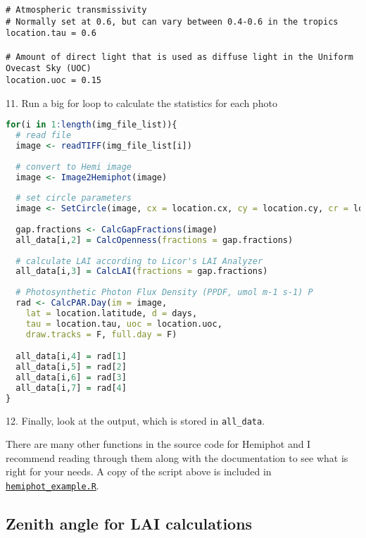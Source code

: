 \documentclass{article}
\newcommand\file[1]{\texttt{\underline{#1}}}
\begin{document}
\begin{minipage}{\linewidth}
\begin{lstlisting}
# Atmospheric transmissivity
# Normally set at 0.6, but can vary between 0.4-0.6 in the tropics
location.tau = 0.6

# Amount of direct light that is used as diffuse light in the Uniform Ovecast Sky (UOC)
location.uoc = 0.15
\end{lstlisting}
\end{minipage}

11. Run a big for loop to calculate the statistics for each photo

\begin{minipage}{\linewidth}
\begin{lstlisting}[language=R]
for(i in 1:length(img_file_list)){
  # read file
  image <- readTIFF(img_file_list[i])
  
  # convert to Hemi image
  image <- Image2Hemiphot(image)
  
  # set circle parameters
  image <- SetCircle(image, cx = location.cx, cy = location.cy, cr = location.cr)
  
  gap.fractions <- CalcGapFractions(image)
  all_data[i,2] = CalcOpenness(fractions = gap.fractions)
  
  # calculate LAI according to Licor's LAI Analyzer 
  all_data[i,3] = CalcLAI(fractions = gap.fractions)
  
  # Photosynthetic Photon Flux Density (PPDF, umol m-1 s-1) P
  rad <- CalcPAR.Day(im = image,
    lat = location.latitude, d = days,
    tau = location.tau, uoc = location.uoc, 
    draw.tracks = F, full.day = F)

  all_data[i,4] = rad[1]
  all_data[i,5] = rad[2]
  all_data[i,6] = rad[3]
  all_data[i,7] = rad[4]
}
\end{lstlisting}
\end{minipage}

12. Finally, look at the output, which is stored in \verb|all_data|.

There are many other functions in the source code for Hemiphot and I recommend reading through them along with the documentation to see what is right for your needs. A copy of the script above is included in \file{hemiphot\_example.R}.

\subsection{Zenith angle for LAI calculations} \label{fov}
\end{document}
